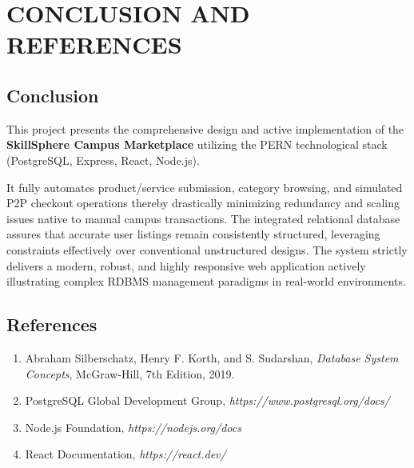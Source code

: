 \documentclass[a4paper,12pt]{report}
\begin{document}
\chapter{CONCLUSION AND REFERENCES}

\section{Conclusion}

This project presents the comprehensive design and active implementation of the \textbf{SkillSphere Campus Marketplace} utilizing the PERN technological stack (PostgreSQL, Express, React, Node.js). 

It fully automates product/service submission, category browsing, and simulated P2P checkout operations thereby drastically minimizing redundancy and scaling issues native to manual campus transactions. The integrated relational database assures that accurate user listings remain consistently structured, leveraging constraints effectively over conventional unstructured designs. The system strictly delivers a modern, robust, and highly responsive web application actively illustrating complex RDBMS management paradigms in real-world environments.

\section{References}

\begin{enumerate}
\item Abraham Silberschatz, Henry F. Korth, and S. Sudarshan, \textit{Database System Concepts}, McGraw-Hill, 7th Edition, 2019.

\item PostgreSQL Global Development Group, \textit{https://www.postgresql.org/docs/}

\item Node.js Foundation, \textit{https://nodejs.org/docs}

\item React Documentation, \textit{https://react.dev/}
\end{enumerate}
\end{document}
